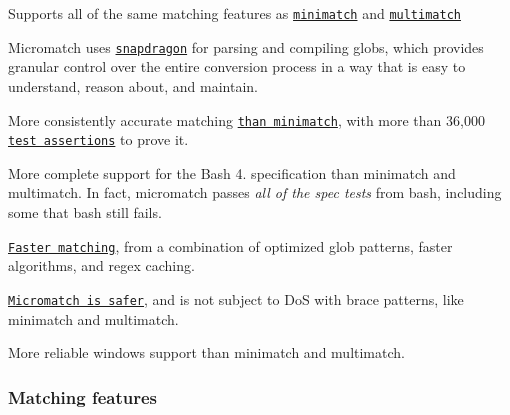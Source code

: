 \begin{DoxyItemize}
\item Supports all of the same matching features as \href{https://github.com/isaacs/minimatch}{\tt minimatch} and \href{https://github.com/sindresorhus/multimatch}{\tt multimatch}
\item Micromatch uses \href{https://github.com/jonschlinkert/snapdragon}{\tt snapdragon} for parsing and compiling globs, which provides granular control over the entire conversion process in a way that is easy to understand, reason about, and maintain.
\item More consistently accurate matching \href{https://github.com/yarnpkg/yarn/pull/3339}{\tt than minimatch}, with more than 36,000 \href{./test}{\tt test assertions} to prove it.
\item More complete support for the Bash 4. specification than minimatch and multimatch. In fact, micromatch passes {\itshape all of the spec tests} from bash, including some that bash still fails.
\item \href{#benchmarks}{\tt Faster matching}, from a combination of optimized glob patterns, faster algorithms, and regex caching.
\item \href{https://github.com/micromatch/braces#braces-is-safe}{\tt Micromatch is safer}, and is not subject to DoS with brace patterns, like minimatch and multimatch.
\item More reliable windows support than minimatch and multimatch.
\end{DoxyItemize}

\subsubsection*{Matching features}


